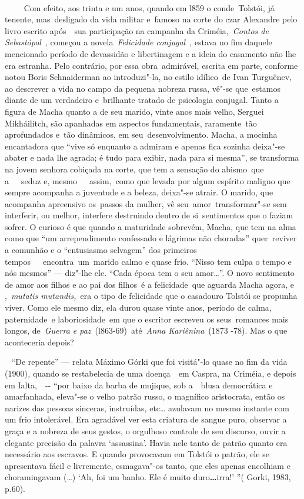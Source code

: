 ~

~~~~ Com efeito, aos trinta e um anos, quando em l859 o conde~Tolstói,
já tenente, mas~desligado da vida militar e~famoso na corte do czar
Alexandre  pelo livro escrito após~~sua participação na campanha da
Criméia,~\emph{Contos de Sebastópol}~, começou a novela~\emph{Felicidade
conjugal~}, estava no fim daquele mencionado período de devassidão e
libertinagem e a ideia do casamento não lhe era estranha. Pelo
contrário, por essa obra~admirável, escrita em parte, conforme notou
Boris Schnaiderman ao introduzi"-la, no estilo idílico~de Ivan Turguênev,
ao descrever a vida no campo da pequena nobreza russa, vê"-se que~estamos
diante de um verdadeiro e~brilhante tratado de psicologia conjugal.
Tanto a figura de Macha quanto a de seu marido, vinte anos mais velho,
Serguei Mikháilitch, são apanhadas em aspectos fundamentais,
raramente~tão aprofundados e~tão dinâmicos, em seu~desenvolvimento.
Macha, a mocinha encantadora que ``vive só enquanto a admiram e apenas
fica sozinha deixa"-se abater e nada lhe agrada; é tudo para exibir, nada
para si mesma'', se transforma na jovem senhora cobiçada na corte, que
tem a sensação do abismo~que a~~~seduz e, mesmo~~~assim,~como que levada
por algum espírito maligno que sempre acompanha a juventude e a beleza,
deixa"-se atrair. O marido, que acompanha apreensivo os~passos da mulher,
vê seu~amor~transformar"-se sem interferir, ou melhor, interfere
destruindo dentro de si~sentimentos que o faziam sofrer. O curioso é que
quando a maturidade sobrevém, Macha, que tem na alma como que ``um
arrependimento confessado e lágrimas não choradas'' quer~reviver a
comunhão e o ``entusiasmo selvagem'' dos primeiros
tempos~~~encontra~um~marido calmo e quase frio. ``Nisso tem culpa o
tempo e nós mesmos'' --- diz"-lhe ele. ``Cada época tem o seu amor\ldots{}''. O
novo sentimento de amor aos filhos e ao pai dos filhos~é a
felicidade~que aguarda Macha agora, e ,~\emph{mutatis mutandis,}~era o
tipo de felicidade que o casadouro Tolstói se propunha viver. Como ele
mesmo diz, ela durou quase vinte anos, período de calma, paternidade~e
laboriosidade~em que o escritor escreveu os seus~romances mais longos,
de~\emph{Guerra e paz}~(l863-69)~até~\emph{Anna Kariênina}~(1873 -78).
Mas o que aconteceria depois?

~ ``De repente'' --- relata Máximo Górki que foi visitá"-lo quase no fim
da vida (1900)\emph{,} quando se restabelecia de uma doença~~em Caspra,
na Criméia, e depois em Ialta,~\emph{~}-\/- ``por baixo da barba de
mujique, sob a~~blusa democrática e amarfanhada, eleva"-se o velho patrão
russo, o magnífico aristocrata, então os narizes das pessoas sinceras,
instruídas, etc\ldots{} azulavam no mesmo instante com um frio intolerável.
Era agradável ver esta criatura de sangue puro, observar a graça e a
nobreza de seus gestos, o orgulhoso controle de seu discurso, ouvir a
elegante precisão da palavra `assassina'. Havia nele tanto de patrão
quanto era necessário aos escravos. E quando provocavam em Tolstói o
patrão, ele se apresentava fácil e livremente, esmagava"-os tanto, que
eles apenas encolhiam e choramingavam (\ldots{}) `Ah, foi um banho. Ele é
muito duro\textbf{\ldots{}}irra!' ''( Gorki, 1983, p.60).


